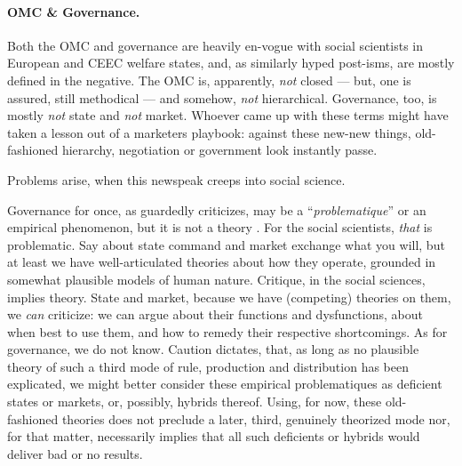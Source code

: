 \documentclass[11pt,a4paper,oneside]{article}
\begin{document}
\paragraph{\gls{OMC} \& Governance.} Both the \gls{OMC} and governance are heavily en-vogue with social scientists in European and \gls{CEEC} welfare states, and, as similarly hyped post-isms, are mostly defined in the negative. 
The \gls{OMC} is, apparently, \emph{not} closed --- but, one is assured, still methodical --- and somehow, \emph{not} hierarchical. 
Governance, too, is mostly \emph{not} state and \emph{not} market. 
Whoever came up with these terms might have taken a lesson out of a marketers playbook: 
against these new-new things, old-fashioned hierarchy, negotiation or government look instantly passe. 

Problems arise, when this newspeak creeps into social science. 

Governance for once, as \citeauthor{Jachtenfuchs2001} guardedly criticizes, may be a ``\emph{problematique}'' or an empirical phenomenon, but it is not a theory \citeyearpar[259]{Jachtenfuchs2001}.
For the social scientists, \emph{that} is problematic. 
Say about state command and market exchange what you will, but at least we have well-articulated theories about how they operate, grounded in somewhat plausible models of human nature. 
Critique, in the social sciences, implies theory. 
State and market, because we have (competing) theories on them, we \emph{can} criticize: 
we can argue about their functions and dysfunctions, about when best to use them, and how to remedy their respective shortcomings. 
As for governance, we do not know. 
Caution dictates, that, as long as no plausible theory of such a third mode of rule, production and distribution has been explicated, we might better consider these empirical problematiques as deficient states or markets, or, possibly, hybrids thereof. 
Using, for now, these old-fashioned theories does not preclude a later, third, genuinely theorized mode nor, for that matter, necessarily implies that all such deficients or hybrids would deliver bad or no results.
\end{document}
